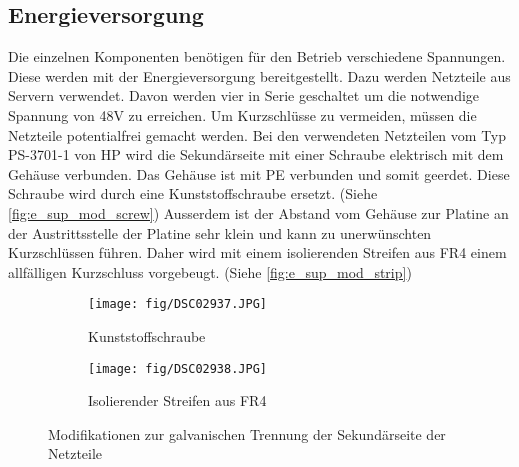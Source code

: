 \subsection{Energieversorgung}
Die einzelnen Komponenten benötigen für den Betrieb verschiedene Spannungen. 
Diese werden mit der Energieversorgung bereitgestellt. Dazu werden Netzteile 
aus Servern verwendet. Davon werden vier in Serie geschaltet um die notwendige 
Spannung von 48\si{\volt} zu erreichen. Um Kurzschlüsse zu vermeiden, müssen 
die Netzteile potentialfrei gemacht werden. Bei den verwendeten Netzteilen vom 
Typ PS-3701-1 von HP wird die Sekundärseite mit einer Schraube elektrisch mit 
dem Gehäuse verbunden. Das Gehäuse ist mit PE verbunden und somit geerdet. 
Diese Schraube wird durch eine Kunststoffschraube ersetzt. (Siehe 
\autoref{fig:e_sup_mod_screw}) Ausserdem ist der Abstand vom Gehäuse zur 
Platine an der Austrittsstelle der Platine sehr klein und kann zu 
unerwünschten Kurzschlüssen führen. Daher wird mit einem isolierenden Streifen 
aus FR4 einem allfälligen Kurzschluss vorgebeugt. (Siehe 
\autoref{fig:e_sup_mod_strip}) 
\begin{figure}[h!]
    \begin{minipage}{0.5\textwidth}
        \begin{subfigure}[a]{\textwidth}
            \centering
            \texttt{[image: fig/DSC02937.JPG]}
            \caption{Kunststoffschraube}
            \label{fig:e_sup_mod_screw}
        \end{subfigure}
    \end{minipage}
    \begin{minipage}{0.5\textwidth}
        \begin{subfigure}[a]{\textwidth}
            \centering
            \texttt{[image: fig/DSC02938.JPG]}
            \caption{Isolierender Streifen aus FR4}
            \label{fig:e_sup_mod_strip}
        \end{subfigure}
    \end{minipage}
    \caption{Modifikationen zur galvanischen Trennung der Sekundärseite der Netzteile}
    \label{fig:e_sup_mod}
\end{figure}

